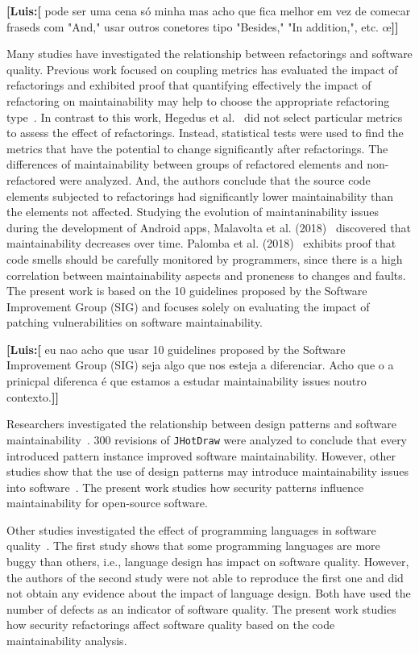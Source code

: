 \documentclass[10pt,conference]{IEEEtran}
\newcommand{\Luis}[1]{\textbf{[Luis:[}{\color{green} #1}\textbf{]]}}
\begin{document}
{\Luis{pode ser uma cena só minha mas acho que fica melhor em vez de comecar
fraseds com "And," usar outros conetores tipo "Besides," "In addition,", etc. œ}

Many studies have investigated the relationship between refactorings and software quality.
Previous work focused on coupling metrics has evaluated the impact of refactorings and
exhibited proof that quantifying effectively the impact of refactoring on maintainability
may help to choose the appropriate refactoring type~\cite{1167822}. In contrast to
this work, Hegedus et al.~\cite{HEGEDUS2018313} did not select particular metrics to
assess the effect of refactorings. Instead, statistical tests were used to find
the metrics that have the potential to change significantly after refactorings.
The differences of maintainability between groups of refactored elements and
non-refactored were analyzed. And, the authors conclude that the source
code elements subjected to refactorings had significantly lower maintainability
than the elements not affected. Studying the evolution of maintaninability issues during the development of Android apps, Malavolta et al. (2018)~\cite{8530041} discovered that maintainability
decreases over time. Palomba et al. (2018)~\cite{Palomba:2018:DIM:3231288.3231337} exhibits
proof that code smells should be carefully monitored by programmers, since there is
a high correlation between maintainability aspects and proneness to changes and faults.
The present work is based on the 10 guidelines proposed
by the Software Improvement Group (SIG) and focuses solely on evaluating
the impact of patching vulnerabilities on software maintainability.

\Luis{eu nao acho que usar 10 guidelines proposed by the Software Improvement
Group (SIG) seja algo que nos esteja a diferenciar. Acho que o a prinicpal
diferenca é que estamos a estudar maintainability issues noutro contexto.}

Researchers investigated the relationship between design patterns and
software maintainability~\cite{10.1007/978-3-642-35267-6-18}. 300 revisions
of \texttt{JHotDraw} were analyzed to conclude that every introduced pattern
instance improved software maintainability. However, other studies show that the
use of design patterns may introduce maintainability issues into software~\cite{4493325}.
The present work studies how security patterns influence maintainability
for open-source software.

Other studies investigated the effect of programming languages in software quality~\cite{Ray:2017:LSP:3144574.3126905,
2019arXiv190110220B}. The first study shows that some programming languages are more buggy than others, i.e.,
language design has impact on software quality. However, the authors of the second
study were not able to reproduce the first one and did not obtain any evidence about the
impact of language design. Both have used the number of defects as an indicator of
software quality. The present work studies how security refactorings affect software quality
based on the code maintainability analysis.

}
\end{document}
